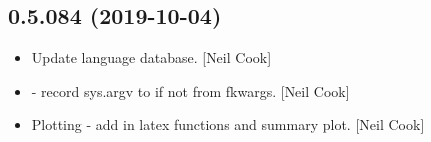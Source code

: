 \documentclass[a4paper,10pt,english]{report}
\begin{document}
\subsection{0.5.084 (2019-10-04)}
\label{\detokenize{misc/changelog:id58}}\begin{itemize}
\item {} 
Update language database. {[}Neil Cook{]}

\item {} 
 - record sys.argv to  if not
from fkwargs. {[}Neil Cook{]}

\item {} 
Plotting - add in latex functions and summary plot. {[}Neil Cook{]}

\end{itemize}
\end{document}
